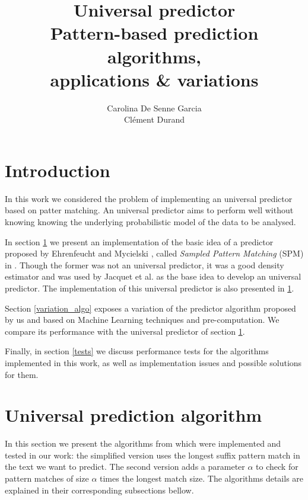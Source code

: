 \documentclass[a4paper,12pt]{article}
\title{%
  Universal predictor\\\small%
  Pattern-based prediction algorithms,\\%
  applications \& variations%
}
\author{%
  Carolina De Senne Garcia\\%
  Clément Durand%
}
\begin{document}
\maketitle

\vspace*{\fill}

\begin{abstract}
  \lipsum[1-2]
\end{abstract}

\vspace*{\fill}

\clearpage

\tableofcontents

\clearpage

\section*{Introduction}

In this work we considered the problem of implementing an universal predictor based on patter matching. An universal predictor aims to perform well without knowing knowing the underlying probabilistic model of the data to be analysed.

In section \ref{paper_algos} we present an implementation of the basic idea of a predictor proposed by Ehrenfeucht and Mycielski \cite{basic_algo}, called \textit{Sampled Pattern Matching} (SPM) in \cite{paper}. Though the former was not an universal predictor, it was a good density estimator and was used by Jacquet et al. \cite{paper} as the base idea to develop an universal predictor. The implementation of this universal predictor is also presented in \ref{paper_algos}.

Section \ref{variation_algo} exposes a variation of the predictor algorithm proposed by us and based on Machine Learning techniques and pre-computation. We compare its performance with the universal predictor of section \ref{paper_algos}.

Finally, in section \ref{tests} we discuss performance tests for the algorithms implemented in this work, as well as implementation issues and possible solutions for them.

\section{Universal prediction algorithm}\label{paper_algos}

  In this section we present the algorithms from \cite{paper} which were implemented and tested in our work: the simplified version uses the longest suffix pattern match in the text we want to predict. The second version adds a parameter $\alpha$ to check for pattern matches of size $\alpha$ times the longest match size. The algorithms details are explained in their corresponding subsections bellow.
\end{document}
